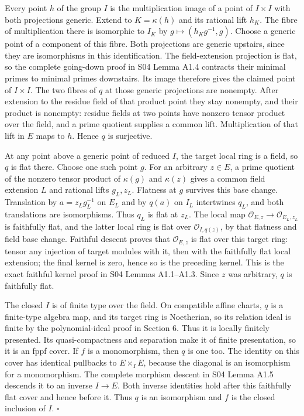 \documentclass[11pt,a4paper,openany]{report}
\newcounter{none}
\begin{document}
Every point \(h\) of the group \(I\) is the multiplication image of a point of \(I\times I\) with both projections generic. Extend to \(K=\kappa(h)\) and its rational lift \(h_K\). The fibre of multiplication there is isomorphic to \(I_K\) by \(g\mapsto(h_Kg^{-1},g)\). Choose a generic point of a component of this fibre. Both projections are generic upstairs, since they are isomorphisms in this identification. The field-extension projection is flat, so the complete going-down proof in S04 Lemma A1.4 contracts their minimal primes to minimal primes downstairs. Its image therefore gives the claimed point of \(I\times I\). The two fibres of \(q\) at those generic projections are nonempty. After extension to the residue field of that product point they stay nonempty, and their product is nonempty: residue fields at two points have nonzero tensor product over the field, and a prime quotient supplies a common lift. Multiplication of that lift in \(E\) maps to \(h\). Hence \(q\) is surjective.

At any point above a generic point of reduced \(I\), the target local ring is a field, so \(q\) is flat there. Choose one such point \(g\). For an arbitrary \(z\in E\), a prime quotient of the nonzero tensor product of \(\kappa(g)\) and \(\kappa(z)\) gives a common field extension \(L\) and rational lifts \(g_L,z_L\). Flatness at \(g\) survives this base change. Translation by \(a=z_Lg_L^{-1}\) on \(E_L\) and by \(q(a)\) on \(I_L\) intertwines \(q_L\), and both translations are isomorphisms. Thus \(q_L\) is flat at \(z_L\). The local map \(\mathcal O_{E,z}\to\mathcal O_{E_L,z_L}\) is faithfully flat, and the latter local ring is flat over \(\mathcal O_{I,q(z)}\), by that flatness and field base change. Faithful descent proves that \(\mathcal O_{E,z}\) is flat over this target ring: tensor any injection of target modules with it, then with the faithfully flat local extension; the final kernel is zero, hence so is the preceding kernel. This is the exact faithful kernel proof in S04 Lemmas A1.1--A1.3. Since \(z\) was arbitrary, \(q\) is faithfully flat.

The closed \(I\) is of finite type over the field. On compatible affine charts, \(q\) is a finite-type algebra map, and its target ring is Noetherian, so its relation ideal is finite by the polynomial-ideal proof in Section 6. Thus it is locally finitely presented. Its quasi-compactness and separation make it of finite presentation, so it is an fppf cover. If \(f\) is a monomorphism, then \(q\) is one too. The identity on this cover has identical pullbacks to \(E\times_I E\), because the diagonal is an isomorphism for a monomorphism. The complete morphism descent in S04 Lemma A1.5 descends it to an inverse \(I\to E\). Both inverse identities hold after this faithfully flat cover and hence before it. Thus \(q\) is an isomorphism and \(f\) is the closed inclusion of \(I\). \(\square\)
\end{document}
